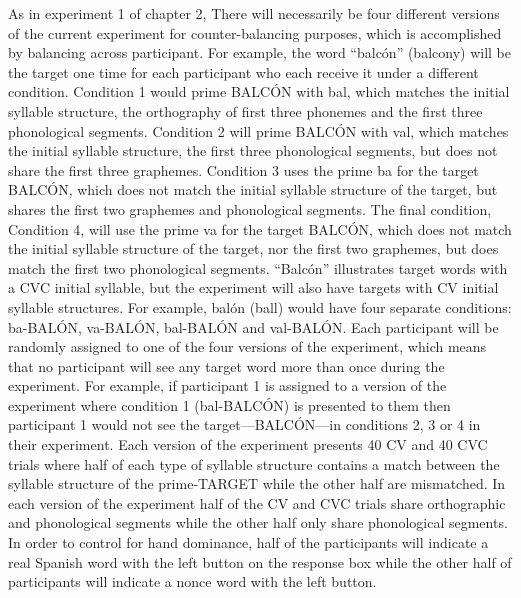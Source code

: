 \documentclass[
12pt, %
english, %
doublespacing, %
nolistspacing, %
liststotoc, %
headsepline, %
chapterinoneline, %
openany, %
]{DoctoralThesis}\usepackage[]{graphicx}\usepackage[]{color}
\begin{document}
As in experiment 1 of chapter 2, There will necessarily be four different versions of the current experiment for counter-balancing purposes, which is accomplished by balancing across participant. For example, the word “balcón” (balcony) will be the target one time for each participant who each receive it under a different condition. Condition 1 would prime BALCÓN with bal, which matches the initial syllable structure, the orthography of first three phonemes and the first three phonological segments. Condition 2 will prime BALCÓN with val, which matches the initial syllable structure, the first three phonological segments, but does not share the first three graphemes. Condition 3 uses the prime ba for the target BALCÓN, which does not match the initial syllable structure of the target, but shares the first two graphemes and phonological segments. The final condition, Condition 4, will use the prime va for the target BALCÓN, which does not match the initial syllable structure of the target, nor the first two graphemes, but does match the first two phonological segments. “Balcón” illustrates target words with a CVC initial syllable, but the experiment will also have targets with CV initial syllable structures. For example, balón (ball) would have four separate conditions: ba-BALÓN, va-BALÓN, bal-BALÓN and val-BALÓN.
Each participant will be randomly assigned to one of the four versions of the experiment, which means that no participant will see any target word more than once during the experiment. For example, if participant 1 is assigned to a version of the experiment where condition 1 (bal-BALCÓN) is presented to them then participant 1 would not see the target—BALCÓN—in conditions 2, 3 or 4 in their experiment. Each version of the experiment presents 40 CV and 40 CVC trials where half of each type of syllable structure contains a match between the syllable structure of the prime-TARGET while the other half are mismatched. In each version of the experiment half of the CV and CVC trials share orthographic and phonological segments while the other half only share phonological segments. In order to control for hand dominance, half of the participants will indicate a real Spanish word with the left button on the response box while the other half of participants will indicate a nonce word with the left button.
\end{document}
